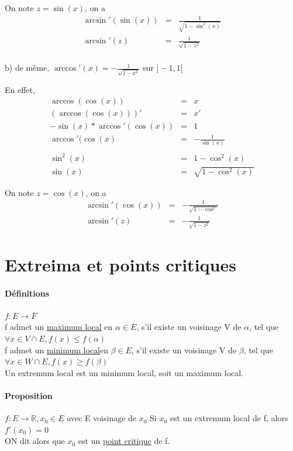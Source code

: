 On note $z = \sin(x)$, on a \[\begin{array}{rcl}
		\arcsin'(\sin(x)) &=& \frac{1}{\sqrt{1-\sin^2(x)}} \\
		\arcsin'(z) &=& \frac{1}{\sqrt{1-z^2}} \\
\end{array}\]

b)
de même, $\arccos'(x) = -\frac{1}{\sqrt{1-x^2}}$ sur $]-1, 1[$

	En effet, \[\begin{array}{rcl}
		\arccos(\cos(x)) &=& x \\
		(\arccos(\cos(x)))' &=& x' \\
		-\sin(x) * \arccos '(\cos(x)) &=& 1 \\
		\arccos '(\cos(x) &=& -\frac{1}{\sin(x)} \\
		\\
		\sin^2(x) &=& 1 - \cos^2(x) \\
		\sin(x) &=& \sqrt{1-\cos^2(x)}
\end{array}\]

On note $z = \cos(x)$, on a \[\begin{array}{rcl}
\arcsin'(\cos(x)) &=& -\frac{1}{\sqrt{1-\cos^2}} \\
\arcsin'(z) &=& -\frac{1}{\sqrt{1-z^2}}
\end{array}\]

	\section{Extreima et points critiques}

	\paragraph{Définitions} $f:E \rightarrow F$ ~\\
	f admet un \ul{maximum local} en $\alpha \in E$, s'il existe un voisinage V de $\alpha$, tel que $\forall x \in V\cap E,f(x) \leq f(\alpha)$ ~\\
	f admet un \ul{minimum local}en $\beta \in E$, s'il existe un voisinage V de $\beta$, tel que $\forall x \in W\cap E,f(x) \geq f(\beta)$ ~\\
	Un extremum local est un minimum local, soit un maximum local.

	\paragraph{Proposition} $f:E \rightarrow \mathbb{R}, x_0\in E$ avec E voisinage de $x_0$ Si $x_0$ est un extremum local de f, alors $f'(x_0)=0$ ~\\
	ON dit alors que $x_0$ est un \ul{point critique} de f.

